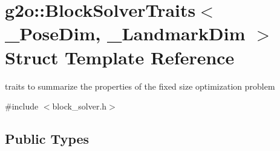 \hypertarget{structg2o_1_1BlockSolverTraits}{}\section{g2o\+:\+:Block\+Solver\+Traits$<$ \+\_\+\+Pose\+Dim, \+\_\+\+Landmark\+Dim $>$ Struct Template Reference}
\label{structg2o_1_1BlockSolverTraits}


traits to summarize the properties of the fixed size optimization problem  




{\ttfamily \#include $<$block\+\_\+solver.\+h$>$}

\subsection*{Public Types}
